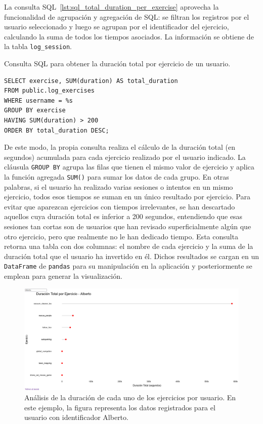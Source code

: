 \documentclass[a4paper, 12pt]{book}
\begin{document}
La consulta SQL~\ref{lst:sql_total_duration_per_exercise} aprovecha la funcionalidad de agrupación y agregación de SQL: se filtran los registros por el usuario seleccionado y luego se agrupan por el identificador del ejercicio, calculando la suma de todos los tiempos asociados. La información se obtiene de la tabla \texttt{log\_session}.

\begin{listing}[h!]
\caption{Consulta SQL para obtener la duración total por ejercicio de un usuario.}
\label{lst:sql_total_duration_per_exercise}
\begin{verbatim}
SELECT exercise, SUM(duration) AS total_duration
FROM public.log_exercises
WHERE username = %s
GROUP BY exercise
HAVING SUM(duration) > 200
ORDER BY total_duration DESC;
\end{verbatim}
\end{listing}

De este modo, la propia consulta realiza el cálculo de la duración total (en segundos) acumulada para cada ejercicio realizado por el usuario indicado. La cláusula \texttt{GROUP BY} agrupa las filas que tienen el mismo valor de ejercicio y aplica la función agregada \texttt{SUM()} para sumar los datos de cada grupo. En otras palabras, si el usuario ha realizado varias sesiones o intentos en un mismo ejercicio, todos esos tiempos se suman en un único resultado por ejercicio. Para evitar que aparezcan ejercicios con tiempos irrelevantes, se han descartado aquellos cuya duración total es inferior a 200 segundos, entendiendo que esas sesiones tan cortas son de usuarios que han revisado superficialmente algún que otro ejercicio, pero que realmente no le han dedicado tiempo. Esta consulta retorna una tabla con dos columnas: el nombre de cada ejercicio y la suma de la duración total que el usuario ha invertido en él. Dichos resultados se cargan en un \texttt{DataFrame} de \texttt{pandas} para su manipulación en la aplicación y posteriormente se emplean para generar la visualización.

\begin{figure}[H]
  \centering
  \includegraphics[width=1.1\textwidth]{img/1a.png}
  \caption{Análisis de la duración de cada uno de los ejercicios por usuario. En este ejemplo, la figura representa los datos registrados para el usuario con identificador Alberto.}
  \label{fig:1a}
\end{figure}
\end{document}
